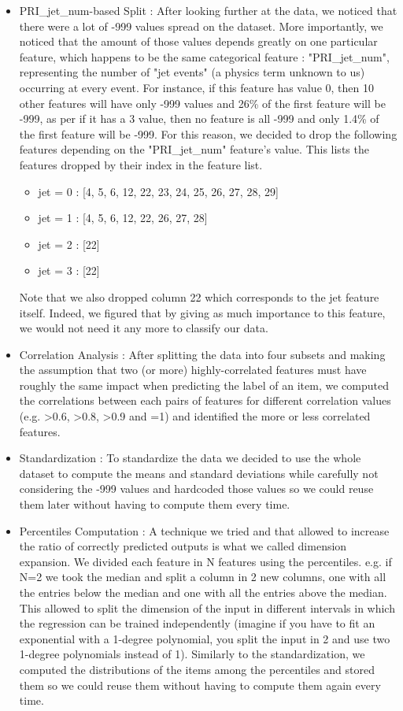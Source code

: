 \documentclass[10pt,conference,compsocconf]{IEEEtran}
\begin{document}
\begin{itemize}
\item PRI\_jet\_num-based Split :
After looking further at the data, we noticed that there were a lot of -999 values spread on the dataset. More importantly, we noticed that the amount of those values depends greatly on one particular feature, which happens to be the same categorical feature : "PRI\_jet\_num", representing the number of "jet events" (a physics term unknown to us) occurring at every event. For instance, if this feature has value 0, then 10 other features will have only -999 values and 26\% of the first feature will be -999, as per if it has a 3 value, then no feature is all -999 and only 1.4\% of the first feature will be -999.
For this reason, we decided to drop the following features depending on the "PRI\_jet\_num" feature's value. This lists the features dropped by their index in the feature list.
\begin{itemize}
\item jet = 0 : [4, 5, 6, 12, 22, 23, 24, 25, 26, 27, 28, 29]
\item jet = 1 : [4, 5, 6, 12, 22, 26, 27, 28]
\item jet = 2 : [22]
\item jet = 3 : [22]
\end{itemize}
Note that we also dropped column 22 which corresponds to the jet feature itself. Indeed, we figured that by giving as much importance to this feature, we would not need it any more to classify our data.

\item Correlation Analysis :
After splitting the data into four subsets and making the assumption that two (or more) highly-correlated features must have roughly the same impact when predicting the label of an item, we computed the correlations between each pairs of features for different correlation values (e.g. >0.6, >0.8, >0.9 and =1) and identified the more or less correlated features.


\item Standardization :
To standardize the data we decided to use the whole dataset to compute the means and standard deviations while carefully not considering the -999 values and hardcoded those values so we could reuse them later without having to compute them every time. 

\item Percentiles Computation :
A technique we tried and that allowed to increase the ratio of correctly predicted outputs is what we called dimension expansion. We divided each feature in N features using the percentiles. e.g. if N=2 we took the median and split a column in 2 new columns, one with all the entries below the median and one with all the entries above the median. This allowed to split the dimension of the input in different intervals in which the regression can be trained independently (imagine if you have to fit an exponential with a 1-degree polynomial, you split the input in 2 and use two 1-degree polynomials instead of 1). Similarly to the standardization, we computed the distributions of the items among the percentiles and stored them so we could reuse them without having to compute them again every time.


\end{itemize}
\end{document}
